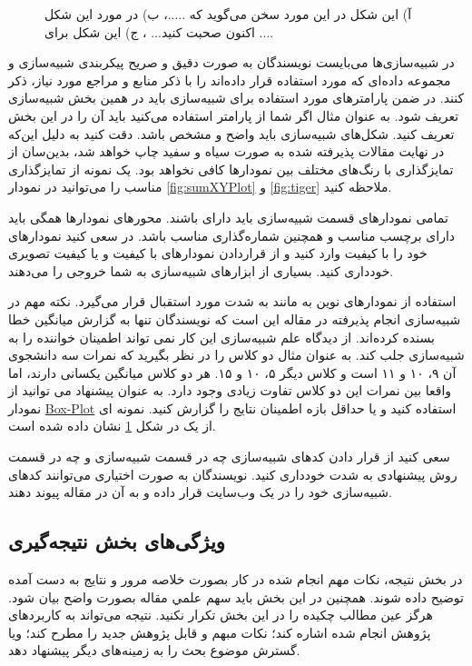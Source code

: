 \documentclass{CSICC}
\begin{document}
\begin{figure}
\begin{subfigure}[b]{0.31\textwidth}
\caption{}
\label{fig:EntropyVersus}
\end{subfigure}
\caption{
آ) این شکل در این مورد سخن می‌گوید که .....، ب) در مورد این شکل اکنون صحبت کنید... ، ج) این شکل برای ....
}
\label{fig:animals}
\end{figure}
در شبیه‌سازی‌ها می‌بایست نویسندگان به صورت دقیق و صریح پیکربندی شبیه‌سازی و مجموعه داده‌ای که مورد استفاده قرار داده‌اند را با ذکر منابع و مراجع مورد نیاز، ذکر کنند. در ضمن پارامترهای مورد استفاده برای شبیه‌سازی باید در همین بخش شبیه‌سازی تعریف شود. به عنوان مثال اگر شما از پارامتر 
استفاده می‌کنید باید آن را در این بخش تعریف کنید. شکل‌های شبیه‌سازی باید واضح و مشخص باشد. دقت کنید به دلیل این‌که در نهایت مقالات پذیرفته شده به صورت سیاه و سفید چاپ خواهد شد، بدین‌سان از تمایزگذاری با رنگ‌های مختلف بین نمودارها کافی نخواهد بود. یک نمونه از تمایزگذاری مناسب را می‌توانید در نمودار \ref{fig:sumXYPlot} و \ref{fig:tiger} ملاحظه کنید. 

تمامی نمودارهای قسمت شبیه‌سازی باید دارای   باشند. محور‌های نمودارها همگی باید دارای برچسب مناسب و همچنین شماره‌گذاری مناسب باشد. در \lr{\LaTeX} سعی کنید نمودارهای خود را با کیفیت  وارد کنید و از قراردادن نمودارهای  با کیفیت  و یا کیفیت تصویری خودداری کنید. بسیاری از ابزارهای شبیه‌سازی به شما خروجی   را می‌دهند. 

استفاده از نمودارهای نوین به مانند  به شدت مورد استقبال قرار می‌گیرد. نکته مهم در شبیه‌سازی
انجام پذیرفته در مقاله این است که نویسندگان تنها به گزارش میانگین خطا بسنده کرده‌اند. از دیدگاه علم شبیه‌سازی این کار نمی تواند اطمینان خواننده را به شبیه‌سازی جلب کند. به عنوان مثال دو کلاس را در نظر بگیرید که نمرات سه دانشجوی آن ۹، ۱۰ و ۱۱ است و کلاس دیگر ۵، ۱۰ و ۱۵. هر دو کلاس میانگین یکسانی دارند، اما واقعا بین نمرات این دو کلاس تفاوت زیادی وجود دارد. به عنوان پیشنهاد می توانید از نمودار
\href{https://en.wikipedia.org/wiki/Box_plot}{Box-Plot}
استفاده کنید و یا حداقل بازه اطمینان نتایج را گزارش کنید. نمونه ای از یک  در شکل
\ref{fig:EntropyVersus}
نشان داده شده است. 

سعی کنید از قرار دادن کدهای شبیه‌سازی چه در قسمت شبیه‌سازی و چه در قسمت روش پیشنهادی به شدت خودداری کنید. نویسندگان به صورت اختیاری می‌توانند کدهای شبیه‌سازی خود را در یک وب‌سایت قرار داده و به آن در مقاله پیوند دهند. 

\subsection{ویژگی‌های بخش نتیجه‌گیری}
در بخش نتيجه، نكات مهم انجام شده در كار بصورت خلاصه مرور و نتايج به دست آمده توضيح داده شوند. همچنين در اين بخش بايد سهم علمي مقاله بصورت واضح بيان شود. هرگز عين مطالب چكيده را در اين بخش تكرار نكنيد. نتيجه می‏‌تواند به کاربردهای پژوهش انجام شده اشاره کند؛ نکات مبهم و قابل پژوهش جديد را مطرح کند؛ ويا گسترش موضوع بحث را به زمينه‏‌های ديگر پيشنهاد دهد.
\end{document}
